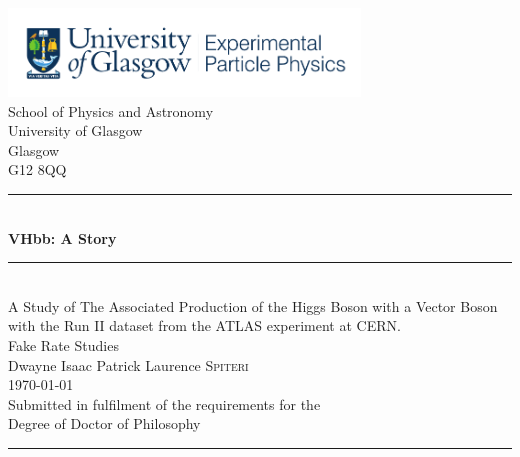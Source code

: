 \documentclass[12pt,titlepage,oneside,table,xcdraw]{book}
\newcommand{\VHbb}{\ensuremath{VH, H\to b\bar{b}} }                    %
\begin{document}
	\begin{center} %
	\includegraphics[width=0.7\textwidth]{ExperPartPhys_colour.pdf}~\\[4mm]%
	School of Physics and Astronomy\\
	University of Glasgow\\
	Glasgow\\
	G12 8QQ\\[4mm] %

	\rule[0.4cm]{15cm}{.2pt}\\ %

	{\Huge \textbf{VHbb: A Story}}
	\rule[0.4cm]{15cm}{.2pt}\\ %
	{\Huge A Study of The Associated Production of the Higgs Boson with a Vector Boson with the Run II dataset from the ATLAS experiment at CERN.\\[1cm] Fake Rate Studies}\\[2cm] %
	{\LARGE Dwayne Isaac Patrick Laurence \textsc{Spiteri}}\\[1cm] %
	{\small \today}\\[1cm] %
	{\small 
		Submitted in fulfilment of the requirements for the\\
		Degree of Doctor of Philosophy}\\[1cm] %
	\rule[0.4cm]{15cm}{.2pt} 
	\end{center}


\frontmatter  %



\doublespacing
\end{document}
